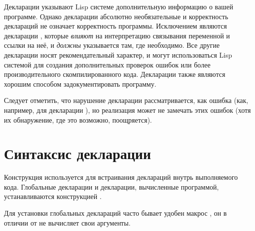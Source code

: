 Декларации указывают Lisp системе дополнительную информацию о вашей
программе. Однако декларации абсолютно необязательные и корректность
деклараций не означает корректность программы. Исключением являются
декларации , которые \emph{влияют} на интерпретацию
связывания переменной и ссылки на неё, и \emph{должны} указывается
там, где необходимо.  Все другие декларации носят рекомендательный
характер, и могут использоваться Lisp системой для создания
дополнительных проверок ошибок или более производительного
скомпилированного кода. Декларации также являются хорошим способом
задокументировать программу.

Следует отметить, что нарушение декларации рассматривается, как ошибка (как,
например, для декларации ), но реализация может не замечать этих
ошибок (хотя их обнаружение, где это возможно, поощряется).

\section{Синтаксис декларации}
\label{DECLARE-SYNTAX-SECTION}

Конструкция  используется для встраивания деклараций внутрь
выполняемого кода. Глобальные декларации и декларации, вычисленные программой,
устанавливаются конструкцией .

Для установки глобальных деклараций часто бывает удобен макрос
, он в отличии от  не вычисляет свои
аргументы.

